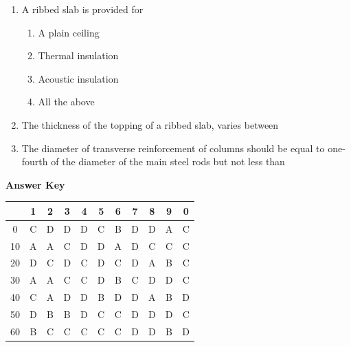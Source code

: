 \documentclass[11pt,a4paper]{article}
\begin{document}
\begin{enumerate}
\item{A ribbed slab is provided for}
\begin{enumerate}[label=\Alph*.]
\item{A plain ceiling}
\item{Thermal insulation}
\item{Acoustic insulation}
\item{All the above}
\end{enumerate}
\item{The thickness of the topping of a ribbed slab, varies between}
\\
\item{The diameter of transverse reinforcement of columns should be equal to one-fourth of the diameter of the main steel rods but not less than}
\\\begin{enumerate*}[itemjoin=\qquad, label=\Alph*.]
\item{4 mm}
\item{5 mm}
\item{6 mm}
\item{7 mm}
\end{enumerate*}
\end{enumerate}
\textbf{Answer Key}
\begin{tabular}{ | c | c c c c c c c c c c | }
\hline
 & 1 & 2 & 3 & 4 & 5 & 6 & 7 & 8 & 9 & 0 \\
\hline
0 & C & D & D & D & C & B & D & D & A & C \\
10 & A & A & C & D & D & A & D & C & C & C \\
20 & D & C & D & C & D & C & D & A & B & C \\
30 & A & A & C & C & D & B & C & D & D & C \\
40 & C & A & D & D & B & D & D & A & B & D \\
50 & D & B & B & D & C & C & D & D & D & C \\
60 & B & C & C & C & C & C & D & D & B & D \\
\hline
\end{tabular}
\clearpage
\end{document}
